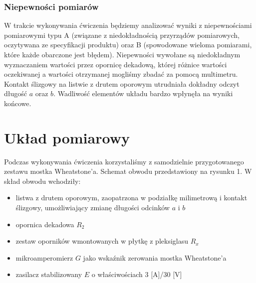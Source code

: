 \documentclass[a4paper,12pts]{article}
\begin{document}

	\subsubsection{Niepewności pomiarów}
	
	W trakcie wykonywania ćwiczenia będziemy analizować wyniki z niepewnościami pomiarowymi typu A (związane z niedokładnością przyrządów pomiarowych, oczytywana ze specyfikacji produktu) oraz B (spowodowane wieloma pomiarami, które każde obarczone jest błędem). Niepewności wywołane są niedokładnym wyznaczaniem wartości przez opornicę dekadową, której różnice wartości oczekiwanej a wartości otrzymanej mogliśmy zbadać za pomocą multimetru. Kontakt ślizgowy na listwie z drutem oporowym utrudniała dokładny odczyt długość $a$ oraz $b$. Wadliwość elementów układu bardzo wpłynęła na wyniki końcowe.
	
	
	\section{Układ pomiarowy}
	
	Podczas wykonywania ćwiczenia korzystaliśmy z samodzielnie przygotowanego zestawu mostka Wheatstone'a. Schemat obwodu przedstawiony na rysunku 1. W skład obwodu wchodziły:
	
	\begin{itemize}
		\item listwa z drutem oporowym, zaopatrzona w podziałkę milimetrową i kontakt ślizgowy, umożliwiający zmianę długości odcinków $a$ i $b$
		\item opornica dekadowa $R_{2}$
		\item zestaw oporników wmontowanych w płytkę z pleksiglasu $R_{x}$
		\item mikroamperomierz $G$ jako wskaźnik zerowania mostka Wheatstone'a
		\item zasilacz stabilizowany $E$ o właściwościach 3 [A]/30 [V]
	\end{itemize}
	
\end{document}
